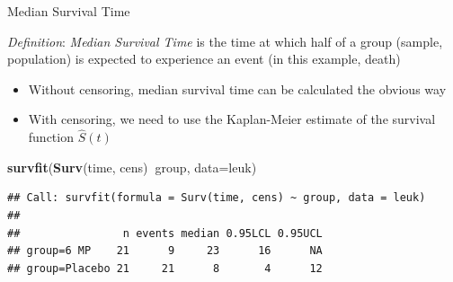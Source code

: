 \documentclass[
  ignorenonframetext,
]{beamer}
\newenvironment{Shaded}{\begin{snugshade}}{\end{snugshade}}
\newcommand{\DataTypeTok}[1]{\textcolor[rgb]{0.13,0.29,0.53}{#1}}
\newcommand{\KeywordTok}[1]{\textcolor[rgb]{0.13,0.29,0.53}{\textbf{#1}}}
\newcommand{\NormalTok}[1]{#1}
\newcommand{\OperatorTok}[1]{\textcolor[rgb]{0.81,0.36,0.00}{\textbf{#1}}}
\providecommand{\tightlist}{%
  \setlength{\itemsep}{0pt}\setlength{\parskip}{0pt}}
\begin{document}
\begin{frame}[fragile]{Median Survival Time}
\protect\hypertarget{median-survival-time}{}

\emph{Definition}: \emph{Median Survival Time} is the time at which half
of a group (sample, population) is expected to experience an event (in
this example, death)

\begin{itemize}
\tightlist
\item
  Without censoring, median survival time can be calculated the obvious
  way
\item
  With censoring, we need to use the Kaplan-Meier estimate of the
  survival function \(\hat S(t)\)
\end{itemize}

\footnotesize

\begin{Shaded}
\begin{Highlighting}[]
\KeywordTok{survfit}\NormalTok{(}\KeywordTok{Surv}\NormalTok{(time, cens)}\OperatorTok{~}\NormalTok{group, }\DataTypeTok{data=}\NormalTok{leuk)}
\end{Highlighting}
\end{Shaded}

\begin{verbatim}
## Call: survfit(formula = Surv(time, cens) ~ group, data = leuk)
## 
##                n events median 0.95LCL 0.95UCL
## group=6 MP    21      9     23      16      NA
## group=Placebo 21     21      8       4      12
\end{verbatim}

\end{frame}
\end{document}
